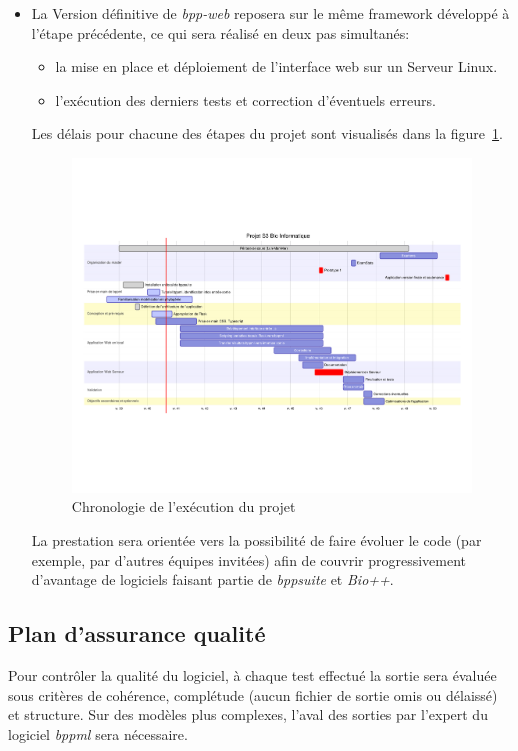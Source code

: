 \begin{itemize}
	\item La Version définitive de \textit{bpp-web} reposera sur le même framework développé
	à l'étape précédente, ce qui sera réalisé en deux pas simultanés:
	\begin{itemize}
		\item la mise en place et déploiement de l'interface web sur un Serveur Linux.
		\item l'exécution des derniers tests et correction d'éventuels erreurs.
	\end{itemize}
	
	Les délais pour chacune des étapes du projet sont visualisés dans la figure~\ref{planning}.
	\begin{figure}[ht!]
		\caption{\label{planning} Chronologie de l'exécution du projet}
		\includegraphics[trim={1.5cm 8cm 2cm 8cm},clip,width=\textwidth]{fig/mermaid1.pdf}
	\end{figure}
	
	La prestation sera orientée vers la possibilité de faire évoluer le code (par exemple, par d'autres équipes invitées) 
	afin de couvrir progressivement d'avantage de logiciels faisant partie de \textit{bppsuite} et \textit{Bio++}.
\end{itemize}


\subsection{Plan d'assurance qualité}
 Pour contrôler la qualité du logiciel, à chaque test effectué la sortie sera  
 évaluée sous critères de cohérence, complétude (aucun fichier de sortie omis ou délaissé)
 et structure. Sur des modèles plus complexes, l'aval des sorties par l'expert du logiciel \textit{bppml} sera nécessaire.
 
